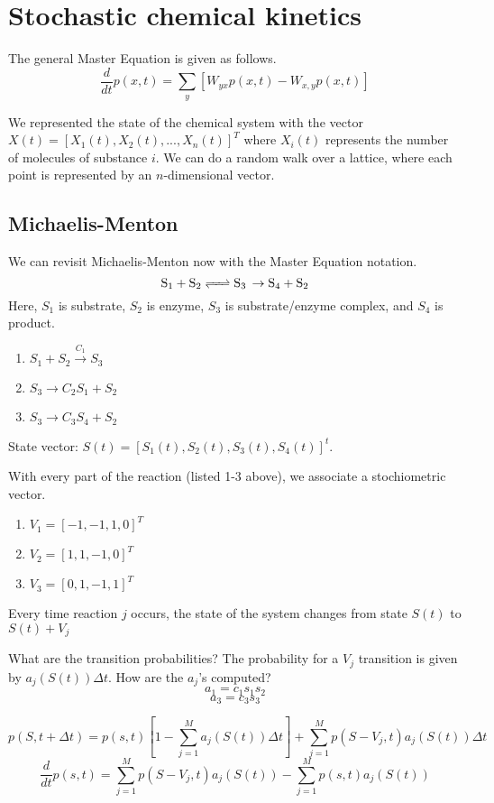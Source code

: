 \documentclass[10pt]{article}
\newenvironment{menumerate}
{
  \begin{enumerate}
  \setlength{\itemsep}{1pt}
  \setlength{\parskip}{0pt}
  \setlength{\parsep}{0pt}}{\end{enumerate}
}
\begin{document}
\section*{Stochastic chemical kinetics}

The general Master Equation is given as follows. \[ \frac{d}{dt}p(x, t) = \sum_y\left[ W_{yx}p(x,t) - W_{x,y}p(x,t) \right] \]

We represented the state of the chemical system with the vector $X(t) = [X_1(t), X_2(t), ..., X_n(t)]^T$ where $X_i(t)$ represents the number of molecules of substance $i$.
We can do a random walk over a lattice, where each point is represented by an $n$-dimensional vector.

\subsection*{Michaelis-Menton}
We can revisit Michaelis-Menton now with the Master Equation notation. \[ \ce{S_1 + S_2 <=> S_3 \rightarrow S_4 + S_2} \]
Here, $S_1$ is substrate, $S_2$ is enzyme, $S_3$ is substrate/enzyme complex, and $S_4$ is product.

\begin{menumerate}
  \item $S_1 + S_2 \xrightarrow{C_1} S_3$
  \item $S_3 \rightarrow{C_2} S_1 + S_2$
  \item $S_3 \rightarrow{C_3} S_4 + S_2$
\end{menumerate}

State vector:  $S(t) = [S_1(t), S_2(t), S_3(t), S_4(t)]^t$.

With every part of the reaction (listed 1-3 above), we associate a stochiometric vector.

\begin{menumerate}
 \item $V_1 = [-1, -1, 1, 0]^T$
 \item $V_2 = [1, 1, -1, 0]^T$
 \item $V_3 = [0, 1, -1, 1]^T$
\end{menumerate}

Every time reaction $j$ occurs, the state of the system changes from state $S(t)$ to $S(t)+V_j$

What are the transition probabilities? The probability for a $V_j$ transition is given by $a_j(S(t))\Delta t$. How are the $a_j$'s computed? \[ a_1 = c_1 s_1 s_2 \] \[ a_3 = c_3 s_3 \]

\[ p(S, t + \Delta t) = p(s,t)\left[ 1 - \sum_{j=1}^{M} a_j(S(t))\Delta t \right] + \sum_{j=1}^{M}p(S-V_j,t)a_j(S(t))\Delta t \]
\[ \frac{d}{dt}p(s,t) = \sum_{j=1}^{M}p(S-V_j, t)a_j(S(t))-\sum_{j=1}^{M}p(s,t)a_j(S(t)) \]
\end{document}
